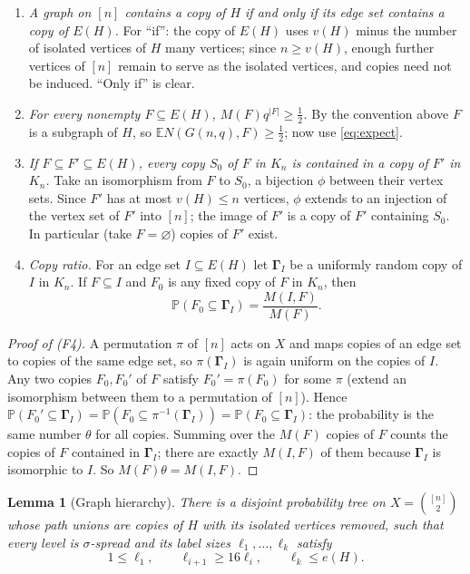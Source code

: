 \documentclass[11pt]{article}
\newtheorem{lemma}[theorem]{Lemma}
\numberwithin{equation}{section}
\newcommand{\PP}{\mathbb P}
\newcommand{\EE}{\mathbb E}
\newcommand{\GG}{\boldsymbol\Gamma}
\begin{document}
\begin{enumerate}[label=(F\arabic*),leftmargin=2.6em,itemsep=3pt]
 \item \emph{A graph on $[n]$ contains a copy of $H$ if and only if its
 edge set contains a copy of $E(H)$.} For ``if'': the copy of $E(H)$
 uses $v(H)$ minus the number of isolated vertices of $H$ many
 vertices; since $n\ge v(H)$, enough further vertices of $[n]$ remain
 to serve as the isolated vertices, and copies need not be induced.
 ``Only if'' is clear.
 \item \emph{For every nonempty $F\subseteq E(H)$,
 $M(F)q^{|F|}\ge\frac12$.} By the convention above $F$ is a subgraph of
 $H$, so $\EE N(G(n,q),F)\ge\frac12$; now use \eqref{eq:expect}.
 \item \emph{If $F\subseteq F'\subseteq E(H)$, every copy $S_0$ of $F$
 in $K_n$ is contained in a copy of $F'$ in $K_n$.} Take an isomorphism
 from $F$ to $S_0$, a bijection $\phi$ between their vertex sets. Since
 $F'$ has at most $v(H)\le n$ vertices, $\phi$ extends to an injection
 of the vertex set of $F'$ into $[n]$; the image of $F'$ is a copy of
 $F'$ containing $S_0$. In particular (take $F=\varnothing$) copies of
 $F'$ exist.
 \item \emph{Copy ratio.} For an edge set $I\subseteq E(H)$ let $\GG_I$
 be a uniformly random copy of $I$ in $K_n$. If $F\subseteq I$ and
 $F_0$ is any fixed copy of $F$ in $K_n$, then
 \begin{equation}\label{eq:copy-ratio}
  \PP(F_0\subseteq\GG_I)=\frac{M(I,F)}{M(F)}.
 \end{equation}
\end{enumerate}

\begin{proof}[Proof of (F4)]
A permutation $\pi$ of $[n]$ acts on $X$ and maps copies of an edge set
to copies of the same edge set, so $\pi(\GG_I)$ is again uniform on the
copies of $I$. Any two copies $F_0,F_0'$ of $F$ satisfy
$F_0'=\pi(F_0)$ for some $\pi$ (extend an isomorphism between them to a
permutation of $[n]$). Hence
$\PP(F_0'\subseteq\GG_I)=\PP(F_0\subseteq\pi^{-1}(\GG_I))
=\PP(F_0\subseteq\GG_I)$: the probability is the same number $\theta$
for all copies. Summing over the $M(F)$ copies of $F$ counts the copies
of $F$ contained in $\GG_I$; there are exactly $M(I,F)$ of them because
$\GG_I$ is isomorphic to $I$. So $M(F)\theta=M(I,F)$.
\end{proof}

\begin{lemma}[Graph hierarchy]\label{lem:hierarchy}
There is a disjoint probability tree on
$X=\binom{[n]}2$ whose path unions are copies of $H$ with its isolated
vertices removed, such that every level is $\sigma$-spread and its label
sizes $\ell_1,\ldots,\ell_k$ satisfy
\[
 1\le\ell_1,\qquad \ell_{i+1}\ge16\ell_i,
 \qquad \ell_k\le e(H).
\]
\end{lemma}
\end{document}
